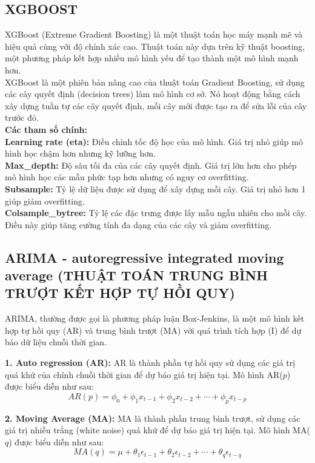 \documentclass[conference]{IEEEtran}
\begin{document}
\subsection{XGBOOST}
XGBoost (Extreme Gradient Boosting) là một thuật toán học máy mạnh mẽ và hiệu quả cùng với độ chính xác cao. Thuật toán này dựa trên kỹ thuật boosting, một phương pháp kết hợp nhiều mô hình yếu để tạo thành một mô hình mạnh hơn.\\
XGBoost là một phiên bản nâng cao của thuật toán Gradient Boosting, sử dụng các cây quyết định (decision trees) làm mô hình cơ sở. Nó hoạt động bằng cách xây dựng tuần tự các cây quyết định, mỗi cây mới được tạo ra để sửa lỗi của cây trước đó.\\
\textbf{Các tham số chính:}\\
\textbf{Learning rate (eta):} Điều chỉnh tốc độ học của mô hình. Giá trị nhỏ giúp mô hình học chậm hơn nhưng kỹ lưỡng hơn.\\
\textbf{Max\_depth:} Độ sâu tối đa của các cây quyết định. Giá trị lớn hơn cho phép mô hình học các mẫu phức tạp hơn nhưng có nguy cơ overfitting.\\
\textbf{Subsample:} Tỷ lệ dữ liệu được sử dụng để xây dựng mỗi cây. Giá trị nhỏ hơn 1 giúp giảm overfitting.\\
\textbf{Colsample\_bytree:} Tỷ lệ các đặc trưng được lấy mẫu ngẫu nhiên cho mỗi cây. Điều này giúp tăng cường tính đa dạng của các cây và giảm overfitting.\\

\subsection{ARIMA - autoregressive integrated moving average (THUẬT TOÁN TRUNG BÌNH TRƯỢT KẾT HỢP TỰ HỒI QUY)}

ARIMA, thường được gọi là phương pháp luận Box-Jenkins, là một mô hình kết hợp tự hồi quy (AR) và trung bình trượt (MA) với quá trình tích hợp (I) để dự báo dữ liệu chuỗi thời gian. 

\textbf{1. Auto regression (AR):} 
AR là thành phần tự hồi quy sử dụng các giá trị quá khứ của chính chuỗi thời gian để dự báo giá trị hiện tại. Mô hình AR($p$) được biểu diễn như sau:
\begin{equation}
AR(p) = \phi_0 + \phi_1 x_{t-1} + \phi_2 x_{t-2} + \cdots + \phi_p x_{t-p}
\end{equation}

\textbf{2. Moving Average (MA):}
MA là thành phần trung bình trượt, sử dụng các giá trị nhiễu trắng (white noise) quá khứ để dự báo giá trị hiện tại. Mô hình MA($q$) được biểu diễn như sau:
\begin{equation}
MA(q) = \mu + \theta_1 \epsilon_{t-1} + \theta_2 \epsilon_{t-2} + \cdots + \theta_q \epsilon_{t-q}
\end{equation}
\end{document}
